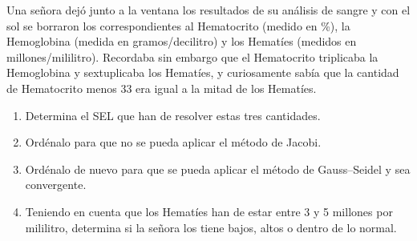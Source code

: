 \documentclass[12pt]{article}
\begin{document}
	\begin{ejercicio}
		Una señora dejó junto a la ventana los resultados de su análisis de sangre y con el sol se borraron los correspondientes al Hematocrito (medido en \%), la Hemoglobina (medida en gramos/decilitro) y los Hematíes (medidos en millones/mililitro). Recordaba sin embargo que el Hematocrito triplicaba la Hemoglobina y sextuplicaba los Hematíes, y curiosamente sabía que la cantidad de Hematocrito menos 33 era igual a la mitad de los Hematíes.
		
		\begin{enumerate}[label=\alph*)] 
			\item Determina el SEL que han de resolver estas tres cantidades.
			
			\item Ordénalo para que no se pueda aplicar el método de Jacobi.
			
			\item Ordénalo de nuevo para que se pueda aplicar el método de Gauss–Seidel y sea convergente.
			
			\item Teniendo en cuenta que los Hematíes han de estar entre 3 y 5 millones por mililitro, determina si la
			señora los tiene bajos, altos o dentro de lo normal.
		\end{enumerate}
	\end{ejercicio}
	
\end{document}

